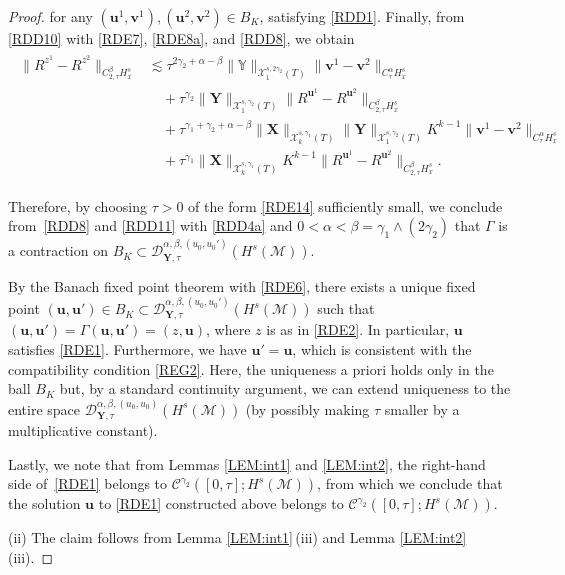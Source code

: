 \documentclass[letterpaper, 11pt,  reqno]{amsart}
\newcommand{\1}{\hspace{0.5mm}\textup{I}\hspace{0.5mm}}
\newcommand{\noi}{\noindent}
\newcommand{\CC}{\mathcal{C}}
\newcommand{\D}{\mathcal{D}}
\newcommand{\al}{\alpha}
\newcommand{\be}{\beta}
\newcommand{\g}{\gamma}
\newcommand{\G}{\Gamma}
\newcommand{\les}{\lesssim}
\newcommand{\M}{\mathcal{M}}
\newcommand{\cX}{\mathcal{X}}
\newcommand{\uu}{\mathbf{u}}
\newcommand{\vv}{\mathbf{v}}
\newcommand{\YYb}{\mathbb{Y}}
\newcommand{\XX}{\mathbf{X}}
\newcommand{\YY}{\mathbf{Y}}
\numberwithin{equation}{section}
\numberwithin{theorem}{section}
\begin{document}
\begin{proof}
\noi
for any $(\uu^1, \vv^1), (\uu^2, \vv^2) \in B_K$, 
satisfying \eqref{RDD1}.
Finally, 
from \eqref{RDD10} with \eqref{RDE7}, 
 \eqref{RDE8a}, and \eqref{RDD8}, we obtain
\begin{align}
\begin{split}
\| R^{z^1} - R^{z^2}\|_{C^\be_{2, \tau}H^s_x}
&    \les 
\tau^{2\g_2 + \al - \be} \|\YYb\|_{\cX^{s, 2\g_2}_1(T)}\|\vv^1 - \vv^2\|_{C^\al_\tau H^s_x}\\
& \quad + \tau^{\g_2}
\|\YY\|_{\cX^{s, \g_2}_1(T)}
\| R^{\uu^1} - R^{\uu^2}\|_{C^\be_{2, \tau } H^s_x}\\
& \quad 
+ 
 \tau^{\g_1 + \g_2 + \al - \be} \|\XX\|_{\cX^{s, \g_1}_k(T)}
\|\YY\|_{\cX^{s, \g_2}_1(T)}
K^{k-1}
 \|\vv^1 - \vv^2\|_{C^\al_\tau H^s_x}\\
& \quad 
+ 
 \tau^{\g_1} \|\XX\|_{\cX^{s, \g_1}_k(T)}
K^{k-1}
\| R^{\uu^1} - R^{\uu^2}\|_{C^\be_{2, \tau } H^s_x}.
\end{split}
\label{RDD11}
\end{align}


\noi
Therefore, by 
 choosing 
$\tau > 0$ of the form \eqref{RDE14}
sufficiently small, 
we conclude from~\eqref{RDD8} and \eqref{RDD11} with
\eqref{RDD4a} and 
 $0 < \al < \be = \g_1\wedge (2\g_2)$
that $\G$ is a contraction on $B_K
\subset \D^{\al, \be, (u_0, u_0')}_{\YY, \tau}(H^s(\M))$.


By the Banach fixed point theorem with  \eqref{RDE6}, 
there exists a unique fixed point $(\uu, \uu') \in B_K
\subset \D^{\al, \be, (u_0, u_0')}_{\YY, \tau}(H^s(\M))$
such that 
$(\uu, \uu')  = \G(\uu, \uu') = (z, \uu)$, 
where $z$ is as in 
\eqref{RDE2}.
In particular, $\uu$ satisfies
\eqref{RDE1}.
Furthermore,  we have $\uu' = \uu$, 
which is consistent with the compatibility condition
\eqref{REG2}.
Here, the uniqueness a priori holds only in the ball $B_K$
but, by a standard continuity argument, 
we can extend uniqueness to the entire space 
$\D^{\al, \be, (u_0, u_0)}_{\YY, \tau}(H^s(\M))$
(by possibly making $\tau$ smaller by a multiplicative constant).




Lastly, we note that from Lemmas \ref{LEM:int1}
and \ref{LEM:int2}, 
 the right-hand side of~\eqref{RDE1}
belongs to $\CC^{\g_2}([0, \tau]; H^s(\M))$, 
from which we conclude that 
the solution $\uu$ to \eqref{RDE1} 
constructed above belongs to $ \CC^{\g_2}([0, \tau]; H^s(\M))$.



\medskip


\noi
(ii) 
The claim follows from 
Lemma \ref{LEM:int1}\,(iii)
and Lemma \ref{LEM:int2}\,(iii).




\end{proof}
\end{document}
